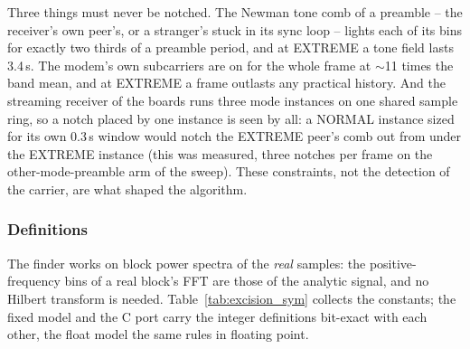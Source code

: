 Three things must never be notched.  The Newman tone comb of a
preamble -- the receiver's own peer's, or a stranger's stuck in its
sync loop -- lights each of its bins for exactly two thirds of a
preamble period, and at EXTREME a tone field lasts 3.4\,s.  The
modem's own subcarriers are on for the whole frame at $\sim$11 times
the band mean, and at EXTREME a frame outlasts any practical
history.  And the streaming receiver of the boards runs three mode
instances on one shared sample ring, so a notch placed by one
instance is seen by all: a NORMAL instance sized for its own 0.3\,s
window would notch the EXTREME peer's comb out from under the
EXTREME instance (this was measured, three notches per frame on the
other-mode-preamble arm of the sweep).  These constraints, not the
detection of the carrier, are what shaped the algorithm.

\subsubsection*{Definitions}

The finder works on block power spectra of the \emph{real} samples:
the positive-frequency bins of a real block's FFT are those of the
analytic signal, and no Hilbert transform is needed.
Table~\ref{tab:excision_sym} collects the constants; the fixed model
and the C port carry the integer definitions bit-exact with each
other, the float model the same rules in floating point.

